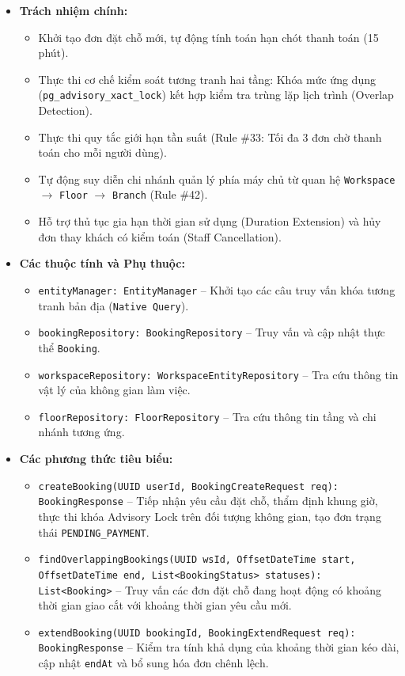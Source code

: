 \begin{itemize}
    \item \textbf{Trách nhiệm chính:}
    \begin{itemize}
        \item Khởi tạo đơn đặt chỗ mới, tự động tính toán hạn chót thanh toán (15 phút).
        \item Thực thi cơ chế kiểm soát tương tranh hai tầng: Khóa mức ứng dụng (\texttt{pg\_advisory\_xact\_lock}) kết hợp kiểm tra trùng lặp lịch trình (Overlap Detection).
        \item Thực thi quy tắc giới hạn tần suất (Rule \#33: Tối đa 3 đơn chờ thanh toán cho mỗi người dùng).
        \item Tự động suy diễn chi nhánh quản lý phía máy chủ từ quan hệ \texttt{Workspace} $\rightarrow$ \texttt{Floor} $\rightarrow$ \texttt{Branch} (Rule \#42).
        \item Hỗ trợ thủ tục gia hạn thời gian sử dụng (Duration Extension) và hủy đơn thay khách có kiểm toán (Staff Cancellation).
    \end{itemize}
    \item \textbf{Các thuộc tính và Phụ thuộc:}
    \begin{itemize}
        \item \texttt{entityManager: EntityManager} -- Khởi tạo các câu truy vấn khóa tương tranh bản địa (\texttt{Native Query}).
        \item \texttt{bookingRepository: BookingRepository} -- Truy vấn và cập nhật thực thể \texttt{Booking}.
        \item \texttt{workspaceRepository: WorkspaceEntityRepository} -- Tra cứu thông tin vật lý của không gian làm việc.
        \item \texttt{floorRepository: FloorRepository} -- Tra cứu thông tin tầng và chi nhánh tương ứng.
    \end{itemize}
    \item \textbf{Các phương thức tiêu biểu:}
    \begin{itemize}
        \item \texttt{createBooking(UUID userId, BookingCreateRequest req): BookingResponse} -- Tiếp nhận yêu cầu đặt chỗ, thẩm định khung giờ, thực thi khóa Advisory Lock trên đối tượng không gian, tạo đơn trạng thái \texttt{PENDING\_PAYMENT}.
        \item \texttt{findOverlappingBookings(UUID wsId, OffsetDateTime start, OffsetDateTime end, List<BookingStatus> statuses): List<Booking>} -- Truy vấn các đơn đặt chỗ đang hoạt động có khoảng thời gian giao cắt với khoảng thời gian yêu cầu mới.
        \item \texttt{extendBooking(UUID bookingId, BookingExtendRequest req): BookingResponse} -- Kiểm tra tính khả dụng của khoảng thời gian kéo dài, cập nhật \texttt{endAt} và bổ sung hóa đơn chênh lệch.
    \end{itemize}
\end{itemize}

